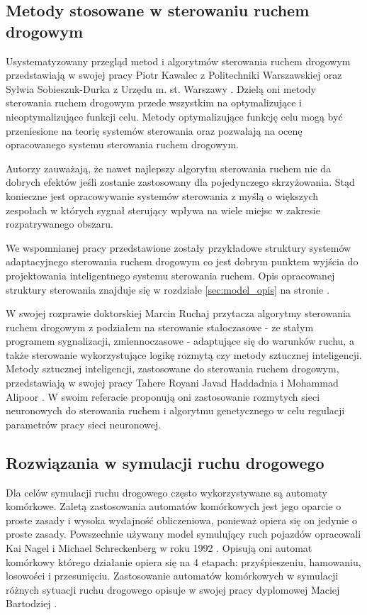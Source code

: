 \subsection{Metody stosowane w sterowaniu ruchem drogowym}
Usystematyzowany przegląd metod i algorytmów sterowania ruchem drogowym przedstawiają w swojej pracy Piotr Kawalec z Politechniki Warszawskiej oraz Sylwia Sobieszuk-Durka z Urzędu m. st. Warszawy \cite{kawalec+sobieszuk-durka}. Dzielą oni metody sterowania ruchem drogowym przede wszystkim na optymalizujące i nieoptymalizujące funkcji celu. Metody optymalizujące funkcję celu mogą być przeniesione na teorię systemów sterowania oraz pozwalają na ocenę opracowanego systemu sterowania ruchem drogowym.

Autorzy zauważają, że nawet najlepszy algorytm sterowania ruchem nie da dobrych efektów jeśli zostanie zastosowany dla pojedynczego skrzyżowania. Stąd konieczne jest opracowywanie systemów sterowania z myślą o większych zespołach w których sygnał sterujący wpływa na wiele miejsc w zakresie rozpatrywanego obszaru.

We wspomnianej pracy przedstawione zostały przykładowe struktury systemów adaptacyjnego sterowania ruchem drogowym co jest dobrym punktem wyjścia do projektowania inteligentnego systemu sterowania ruchem. Opis opracowanej struktury sterowania znajduje się w rozdziale \ref{sec:model_opis} na stronie \pageref{sec:model_opis}.

W swojej rozprawie doktorskiej \cite{ruchaj} Marcin Ruchaj przytacza algorytmy sterowania ruchem drogowym z podziałem na sterowanie stałoczasowe - ze stałym programem sygnalizacji, zmiennoczasowe - adaptujące się do warunków ruchu, a także sterowanie wykorzystujące logikę rozmytą czy metody sztucznej inteligencji. Metody sztucznej inteligencji, zastosowane do sterowania ruchem drogowym, przedstawiają w swojej pracy Tahere Royani Javad Haddadnia i Mohammad Alipoor \cite{royani+haddadnia+alipoor}. W swoim referacie proponują oni zastosowanie rozmytych sieci neuronowych do sterowania ruchem i algorytmu genetycznego w celu regulacji parametrów pracy sieci neuronowej.

\subsection{Rozwiązania w symulacji ruchu drogowego}

Dla celów symulacji ruchu drogowego często wykorzystywane są automaty komórkowe. Zaletą zastosowania automatów komórkowych jest jego oparcie o proste zasady i wysoka wydajność obliczeniowa, ponieważ opiera się on jedynie o proste zasady. Powszechnie używany model symulujący ruch pojazdów opracowali Kai Nagel i Michael Schreckenberg w roku 1992 \cite{nasch}. Opisują oni automat komórkowy którego działanie opiera się na 4 etapach: przyśpieszeniu, hamowaniu, losowości i przesunięciu. Zastosowanie automatów komórkowych w symulacji różnych sytuacji ruchu drogowego opisuje w swojej pracy dyplomowej Maciej Bartodziej \cite{bartodziej}.

